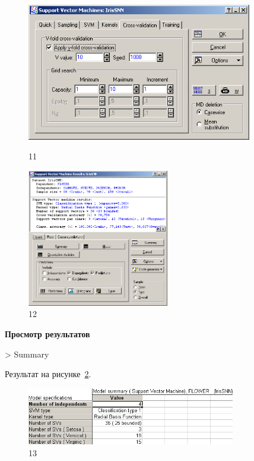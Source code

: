 \begin{figure}[!h]
  \centering

  \begin{minipage}{0.49\textwidth}
    \centering

    \includegraphics[height=6cm]
    {inc/ex_11.PNG}

    \caption{11}

    \label{fig:11}
  \end{minipage}
  \begin{minipage}{0.49\textwidth}
    \centering

    \includegraphics[height=6cm]
    {inc/ex_12.PNG}

    \caption{12}

    \label{fig:12}
  \end{minipage}
\end{figure}

\begin{center}
  \textbf{Просмотр результатов}
\end{center}

> Summary

Результат на рисунке~\ref{fig:13}.

\begin{figure}[!h]
  \centering

  \includegraphics[height=2.5cm]
  {inc/ex_13.PNG}

  \caption{13}

  \label{fig:13}
\end{figure}

